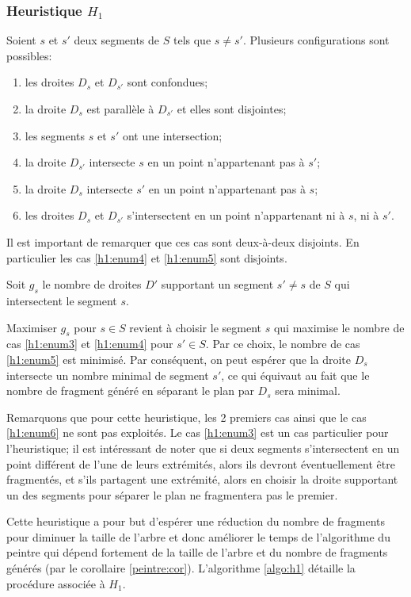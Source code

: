 \subsubsection*{Heuristique $H_1$}
Soient $s$ et $s'$ deux segments de $S$ tels que $s \ne s'$.
Plusieurs configurations sont possibles:
\begin{enumerate}
\item les droites  $D_s$ et  $D_{s'}$ sont confondues; \label{h1:enum1}
\item la droite $D_s$ est parallèle à $D_{s'} $ et elles sont disjointes; \label{h1:enum2}
\item les segments $s$ et $s'$ ont une intersection; \label{h1:enum3}
\item la droite $D_{s'}$ intersecte $s$ en un point
  n'appartenant pas à $s'$;\label{h1:enum4}
\item la droite $D_{s}$ intersecte $s'$ en un point
  n'appartenant pas à $s$; \label{h1:enum5}
\item les droites $D_s$ et $D_{s'}$ s'intersectent en un point n'appartenant ni
  à $s$, ni à $s'$. \label{h1:enum6}
\end{enumerate}

Il est important de remarquer que ces cas sont deux-à-deux disjoints.
En particulier les cas \ref{h1:enum4} et \ref{h1:enum5} sont disjoints.

Soit $g_s$ le nombre de droites $D'$ supportant un segment $s' \neq s$
de $S$ qui intersectent le segment $s$.

Maximiser $g_s$ pour $s \in S$ revient à choisir le segment $s$ qui maximise
le nombre de cas \ref{h1:enum3} et \ref{h1:enum4} pour $s' \in S$.
Par ce choix, le nombre de cas \ref{h1:enum5} est minimisé.
Par conséquent, on peut espérer que la droite $D_s$ intersecte un
nombre minimal de segment $s'$, ce qui équivaut au fait que le
nombre de fragment généré en séparant le plan par $D_s$ sera minimal.

Remarquons que pour cette heuristique, les 2 premiers cas ainsi que
le cas \ref{h1:enum6} ne sont pas exploités.
Le cas \ref{h1:enum3} est un cas particulier pour l'heuristique;
il est intéressant de noter que si deux segments s'intersectent
en un point différent de l'une de leurs extrémités, alors ils devront
éventuellement être fragmentés, et s'ils partagent une extrémité, alors
en choisir la droite supportant un des segments pour séparer le plan ne
fragmentera pas le premier.

Cette heuristique a pour but d'espérer une réduction du nombre de fragments
pour diminuer la taille de l'arbre
et donc améliorer le temps de l'algorithme du peintre qui dépend
fortement de la taille de l'arbre et du nombre de fragments générés (par
le corollaire \ref{peintre:cor}). L'algorithme \ref{algo:h1} détaille
la procédure associée à $H_1$.

